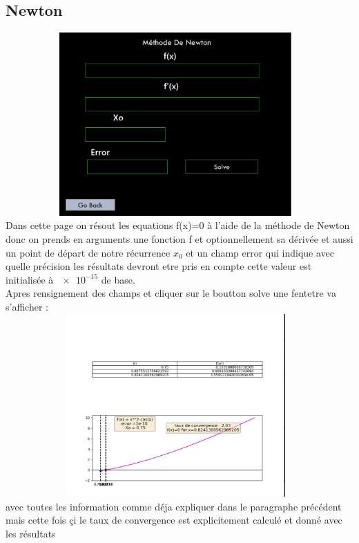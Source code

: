 \documentclass{article}
\begin{document}
\subsection{Newton}
\includegraphics[width=13cm,height=7cm]{img/newton.JPG}\\

Dans cette page on résout les equations f(x)=0 à l'aide de la méthode de Newton donc on prends en arguments une fonction f et optionnellement sa dérivée et aussi un point de départ de notre récurrence  $ x_0 $
et un champ error qui indique avec quelle précision les résultats devront etre pris en compte cette valeur est initialisée à $\num{e-15}$ de base.\\
Apres rensignement des champs et cliquer sur le boutton solve une fentetre va s'afficher :\\
\includegraphics[width=13cm,height=7cm]{img/newton_graph.JPG}\\
avec toutes les information comme déja expliquer dans le paragraphe précédent mais cette fois çi le taux de convergence est explicitement calculé et donné avec les résultats
\end{document}
